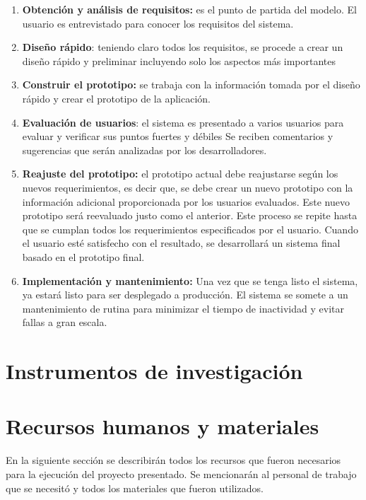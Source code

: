 \begin{enumerate}
	\item \textbf{Obtención y análisis de requisitos:} es el punto de partida del modelo. El usuario es entrevistado para conocer los requisitos del sistema.
	
	\item \textbf{Diseño rápido}: teniendo claro todos los requisitos, se procede a crear un diseño rápido y preliminar incluyendo solo los aspectos más importantes 
	
	\item\textbf{ Construir el prototipo:} se trabaja con la información tomada por el diseño rápido y crear el prototipo de la aplicación.
	
	\item \textbf{Evaluación de usuarios}: el sistema es presentado a varios usuarios para evaluar y verificar sus puntos fuertes y débiles Se reciben comentarios y sugerencias que serán analizadas por los desarrolladores.
	
	\item \textbf{Reajuste del prototipo:} el prototipo actual debe reajustarse según los nuevos requerimientos, es decir que, se debe crear un nuevo prototipo con la información adicional proporcionada por los usuarios evaluados. Este nuevo prototipo será reevaluado justo como el anterior. Este proceso se repite hasta que se cumplan todos los requerimientos especificados por el usuario. Cuando el usuario esté satisfecho con el resultado, se desarrollará un sistema final basado en el prototipo final. 
	
	\item \textbf{Implementación y mantenimiento:} Una vez que se tenga listo el sistema, ya estará listo para ser desplegado a producción. El sistema se somete a un mantenimiento de rutina para minimizar el tiempo de inactividad y evitar fallas a gran escala.
	
\end{enumerate}

\section{Instrumentos de investigación}

\section{Recursos humanos y materiales}

En la siguiente sección se describirán todos los recursos que fueron necesarios para la ejecución del proyecto presentado. Se mencionarán al personal de trabajo que se necesitó y todos los materiales que fueron utilizados. 

